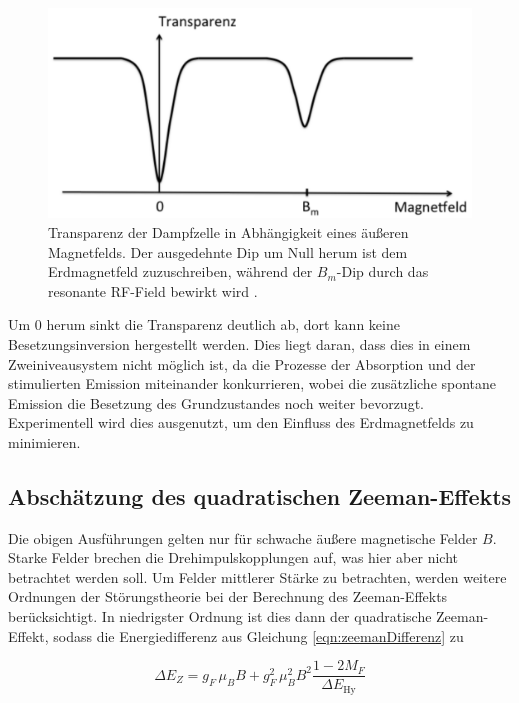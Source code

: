   \begin{figure}
    \centering
    \includegraphics[width=\textwidth]{pictures/transparenz.png}
    \caption{Transparenz der Dampfzelle in Abhängigkeit eines äußeren Magnetfelds. Der ausgedehnte Dip um Null herum ist dem Erdmagnetfeld zuzuschreiben, während der $B_m$-Dip durch das resonante RF-Field bewirkt wird \cite{VersuchsanleitungAlt}.}
    \label{fig:transparenz}
  \end{figure}

  Um 0 herum sinkt die Transparenz deutlich ab, dort kann keine Besetzungsinversion hergestellt werden. Dies liegt daran, dass dies in einem Zweiniveausystem nicht möglich ist, da die Prozesse der Absorption und der stimulierten Emission miteinander konkurrieren, wobei die zusätzliche spontane Emission die Besetzung des Grundzustandes noch weiter bevorzugt. Experimentell wird dies ausgenutzt, um den Einfluss des Erdmagnetfelds zu minimieren.

  \subsection{Abschätzung des quadratischen Zeeman-Effekts}
  \label{subsec:quadratischerZeeman}

  Die obigen Ausführungen gelten nur für schwache äußere magnetische Felder $B$.
  Starke Felder brechen die Drehimpulskopplungen auf, was hier aber nicht betrachtet werden soll.
  Um Felder mittlerer Stärke zu betrachten, werden weitere Ordnungen der Störungstheorie bei der Berechnung des Zeeman-Effekts berücksichtigt. In niedrigster Ordnung ist dies dann der quadratische Zeeman-Effekt, sodass die Energiedifferenz aus Gleichung \eqref{eqn:zeemanDifferenz} zu

  \begin{equation}
    \Delta E_Z = g_F \, \mu_B B + g_F^2 \, \mu_B^2 B^2 \frac{1-2M_F}{\Delta E_{\text{Hy}}}
    \label{eqn:zeemanDifferenzQuadratisch}
  \end{equation}

